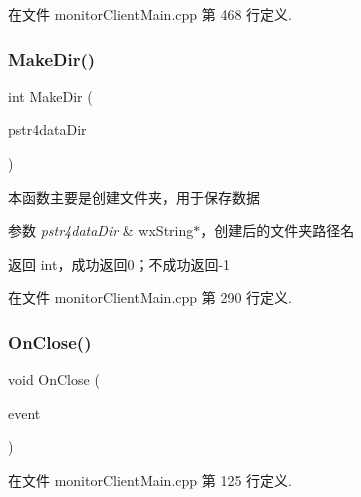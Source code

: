 在文件 monitor\+Client\+Main.\+cpp 第 468 行定义.

\mbox{\label{classmonitor_client_frame_adbc6a4d0a12ea3ab300eb9c9f8c0126b}} 
\subsubsection{\texorpdfstring{Make\+Dir()}{MakeDir()}}
{\footnotesize\ttfamily int Make\+Dir (\begin{DoxyParamCaption}\item[{wx\+String $\ast$}]{pstr4data\+Dir }\end{DoxyParamCaption})\hspace{0.3cm}{\ttfamily [private]}}



本函数主要是创建文件夹，用于保存数据 


\begin{DoxyParams}{参数}
{\em pstr4data\+Dir} & wx\+String$\ast$，创建后的文件夹路径名 \\
\hline
\end{DoxyParams}
\begin{DoxyReturn}{返回}
int，成功返回0；不成功返回-\/1 
\end{DoxyReturn}


在文件 monitor\+Client\+Main.\+cpp 第 290 行定义.

\mbox{\label{classmonitor_client_frame_aa744f336117172b7ab41864141a1ed2d}} 
\subsubsection{\texorpdfstring{On\+Close()}{OnClose()}}
{\footnotesize\ttfamily void On\+Close (\begin{DoxyParamCaption}\item[{wx\+Close\+Event \&}]{event }\end{DoxyParamCaption})\hspace{0.3cm}{\ttfamily [private]}}



在文件 monitor\+Client\+Main.\+cpp 第 125 行定义.

